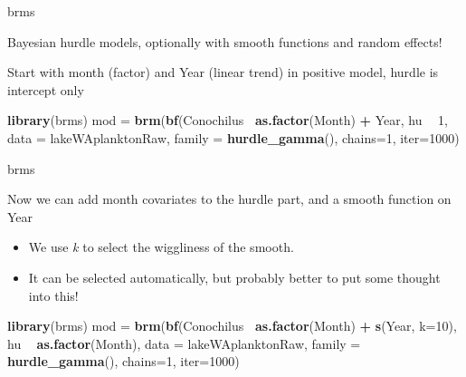 \documentclass[ignorenonframetext,]{beamer}
\newenvironment{Shaded}{\begin{snugshade}}{\end{snugshade}}
\newcommand{\KeywordTok}[1]{\textcolor[rgb]{0.13,0.29,0.53}{\textbf{#1}}}
\newcommand{\DataTypeTok}[1]{\textcolor[rgb]{0.13,0.29,0.53}{#1}}
\newcommand{\DecValTok}[1]{\textcolor[rgb]{0.00,0.00,0.81}{#1}}
\newcommand{\StringTok}[1]{\textcolor[rgb]{0.31,0.60,0.02}{#1}}
\newcommand{\OperatorTok}[1]{\textcolor[rgb]{0.81,0.36,0.00}{\textbf{#1}}}
\newcommand{\NormalTok}[1]{#1}
\providecommand{\tightlist}{%
  \setlength{\itemsep}{0pt}\setlength{\parskip}{0pt}}
\begin{document}
\begin{frame}[fragile]{brms}

Bayesian hurdle models, optionally with smooth functions and random
effects!

Start with month (factor) and Year (linear trend) in positive model,
hurdle is intercept only

\begin{Shaded}
\begin{Highlighting}[]
\KeywordTok{library}\NormalTok{(brms)}
\NormalTok{mod =}\StringTok{ }\KeywordTok{brm}\NormalTok{(}\KeywordTok{bf}\NormalTok{(Conochilus}\OperatorTok{~}\StringTok{ }\KeywordTok{as.factor}\NormalTok{(Month) }\OperatorTok{+}\StringTok{ }\NormalTok{Year, }
\NormalTok{       hu }\OperatorTok{~}\StringTok{ }\DecValTok{1}\NormalTok{, }
      \DataTypeTok{data =}\NormalTok{ lakeWAplanktonRaw, }\DataTypeTok{family =} \KeywordTok{hurdle_gamma}\NormalTok{(), }
        \DataTypeTok{chains=}\DecValTok{1}\NormalTok{, }\DataTypeTok{iter=}\DecValTok{1000}\NormalTok{)}
\end{Highlighting}
\end{Shaded}

\end{frame}

\begin{frame}[fragile]{brms}

Now we can add month covariates to the hurdle part, and a smooth
function on Year

\begin{itemize}
\tightlist
\item
  We use \emph{k} to select the wiggliness of the smooth.
\item
  It can be selected automatically, but probably better to put some
  thought into this!
\end{itemize}

\begin{Shaded}
\begin{Highlighting}[]
\KeywordTok{library}\NormalTok{(brms)}
\NormalTok{mod =}\StringTok{ }\KeywordTok{brm}\NormalTok{(}\KeywordTok{bf}\NormalTok{(Conochilus}\OperatorTok{~}\StringTok{ }\KeywordTok{as.factor}\NormalTok{(Month) }\OperatorTok{+}\StringTok{ }\KeywordTok{s}\NormalTok{(Year, }\DataTypeTok{k=}\DecValTok{10}\NormalTok{), }
\NormalTok{       hu }\OperatorTok{~}\StringTok{ }\KeywordTok{as.factor}\NormalTok{(Month), }
      \DataTypeTok{data =}\NormalTok{ lakeWAplanktonRaw, }\DataTypeTok{family =} \KeywordTok{hurdle_gamma}\NormalTok{(), }
        \DataTypeTok{chains=}\DecValTok{1}\NormalTok{, }\DataTypeTok{iter=}\DecValTok{1000}\NormalTok{)}
\end{Highlighting}
\end{Shaded}

\end{frame}
\end{document}
